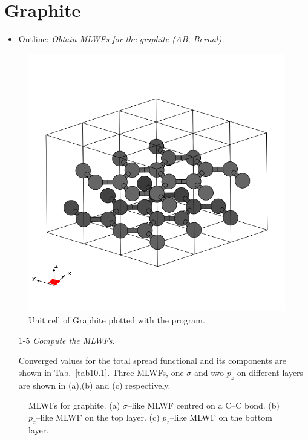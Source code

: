 \section{Graphite}
\label{sec10:graphite}

\begin{itemize}
\item Outline: {\it Obtain MLWFs for the graphite (AB, Bernal).}
\end{itemize}

\begin{figure}[h!]
\centering
\includegraphics[width=0.25\columnwidth,trim={20pt 55pt 35pt 55pt},clip]{figure/example10/graphite.png}
\caption{Unit cell of Graphite plotted with the \xcrysden{} program.}
\label{fig10.0}
\end{figure}

\begin{itemize}
	\item[1-5] {\it Compute the MLWFs.}

	Converged values for the total spread functional and its components are shown in Tab.~\ref{tab10.1}. 
	Three MLWFs, one $\sigma$ and two $p_z$ on different layers are shown in (a),(b) and (c) respectively.
\end{itemize}

\begin{figure}[h!]
\centering
{}
\centering
{}
\centering
{}
\caption{MLWFs for graphite. (a) $\sigma$--like MLWF centred on a C--C bond. (b) $p_z$--like MLWF on the top layer. (c) $p_z$--like MLWF on the bottom layer.}\label{fig10.1}
\end{figure}


